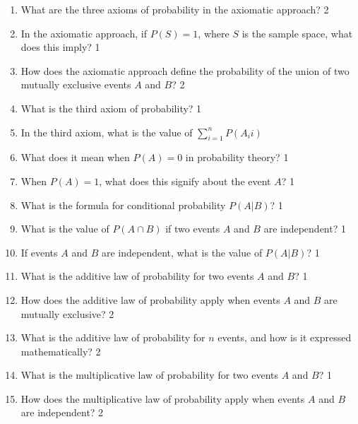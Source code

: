 \documentclass[a4paper,oneside, margin=1.4in]{book}
\begin{document}
\begin{enumerate}
\item What are the three axioms of probability in the axiomatic approach? \hfill 2

\item In the axiomatic approach, if \( P(S) = 1 \), where \( S \) is the sample space, what does this imply? \hfill 1

\item How does the axiomatic approach define the probability of the union of two mutually exclusive events \( A \) and \( B \)? \hfill 2

\item What is the third axiom of probability? \hfill 1

\item In the third axiom, what is the value of $\displaystyle \sum_{i=1}^n P(A_ii)$

\item What does it mean when \( P(A) = 0 \) in probability theory? \hfill 1

\item When \( P(A) = 1 \), what does this signify about the event \( A \)? \hfill 1

\item What is the formula for conditional probability \( P(A|B) \)? \hfill 1

\item What is the value of $P(A \cap B)$ if two events \( A \) and \( B \) are independent? \hfill 1

\item If events \( A \) and \( B \) are independent, what is the value of \( P(A|B) \)? \hfill 1

\item What is the additive law of probability for two events \( A \) and \( B \)? \hfill 1

\item How does the additive law of probability apply when events \( A \) and \( B \) are mutually exclusive? \hfill 2

\item What is the additive law of probability for \( n \) events, and how is it expressed mathematically? \hfill 2

\item What is the multiplicative law of probability for two events \( A \) and \( B \)? \hfill 1

\item How does the multiplicative law of probability apply when events \( A \) and \( B \) are independent? \hfill 2


\end{enumerate}
\end{document}
